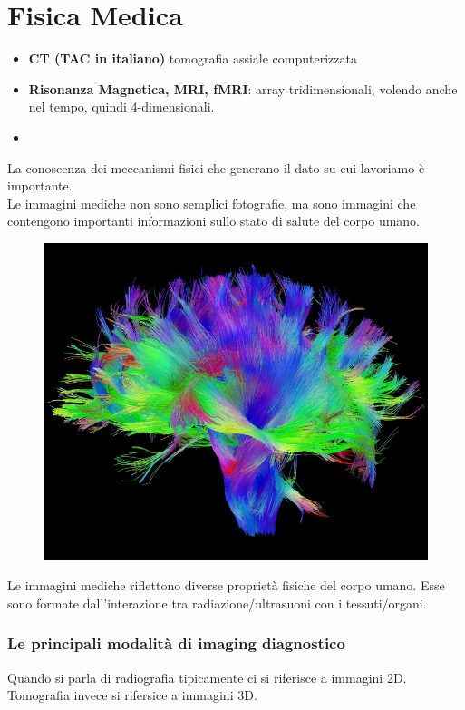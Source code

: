 \chapter{Fisica Medica}

\begin{itemize}
	\item \textbf{CT (TAC in italiano)} tomografia assiale computerizzata
	\item \textbf{Risonanza Magnetica, MRI, fMRI}: array tridimensionali, volendo anche nel tempo, quindi 4-dimensionali.
	\item 
\end{itemize}

La conoscenza dei meccanismi fisici che generano il dato su cui lavoriamo è importante.\\
Le immagini mediche non sono semplici fotografie, ma sono immagini che contengono importanti informazioni sullo stato di salute del corpo umano.\\

\begin{figure}[ht]
	\centering
	\includegraphics[width=0.6\linewidth]{figure_med/White-Matter-Fibers.jpg}
\end{figure}
\FloatBarrier

Le immagini mediche riflettono diverse proprietà fisiche del corpo umano. Esse sono formate dall'interazione tra radiazione/ultrasuoni con i tessuti/organi.\\


\subsection{Le principali modalità di imaging diagnostico}
Quando si parla di radiografia tipicamente ci si riferisce a immagini 2D.\\
Tomografia invece si rifersice a immagini 3D.\\



